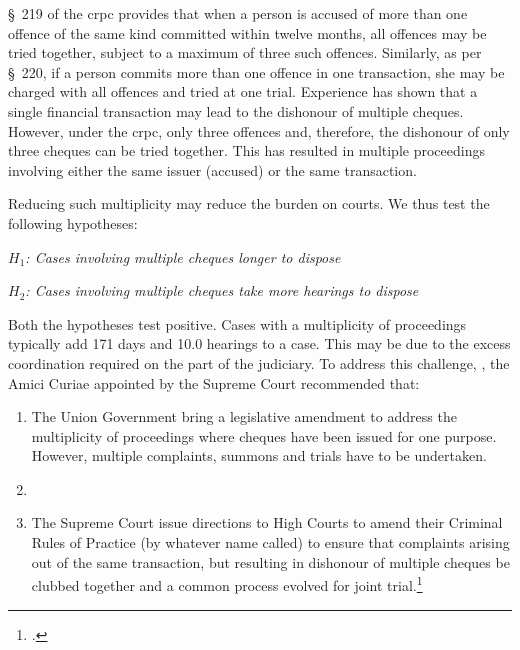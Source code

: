 \S~219 of the \gls{crpc} provides that when a person is
accused of more than one offence of the same kind
committed within twelve months, all offences may be tried together, subject to a maximum of three such offences. Similarly, as per \S~220, if a person commits more than one offence in one transaction, she may be charged with all offences and tried at one trial. Experience has shown that a single financial transaction may lead to the dishonour of multiple cheques. However, under the \gls{crpc}, only three offences and, therefore, the dishonour of only three cheques can be tried together. This has resulted in multiple proceedings involving either the same issuer (accused) or the same transaction.

Reducing such multiplicity may reduce the burden on courts. We thus test the following hypotheses:

\begin{center}
 \textit{\(H_1\): Cases involving multiple cheques longer to dispose}

 \textit{\(H_2\): Cases involving multiple cheques take more hearings to dispose}
\end{center}

Both the hypotheses test positive. Cases with a multiplicity of proceedings typically add 171 days and 10.0 hearings to a case. This may be due to the excess coordination required on the part of the judiciary. To address this challenge, , the Amici Curiae appointed by the Supreme Court recommended that:

\begin{enumerate}
 \item The Union Government bring a legislative amendment to address the multiplicity of proceedings where cheques have been issued for one purpose. However, multiple complaints, summons and trials have to be undertaken.
 
 \item[]
 
 \item The Supreme Court issue directions to High Courts to amend their Criminal Rules of Practice (by whatever name called) to ensure that complaints arising out of the same transaction, but resulting in dishonour of multiple cheques be clubbed together and a common process evolved for joint trial.\footcite{amicus2020_submission}
\end{enumerate}

